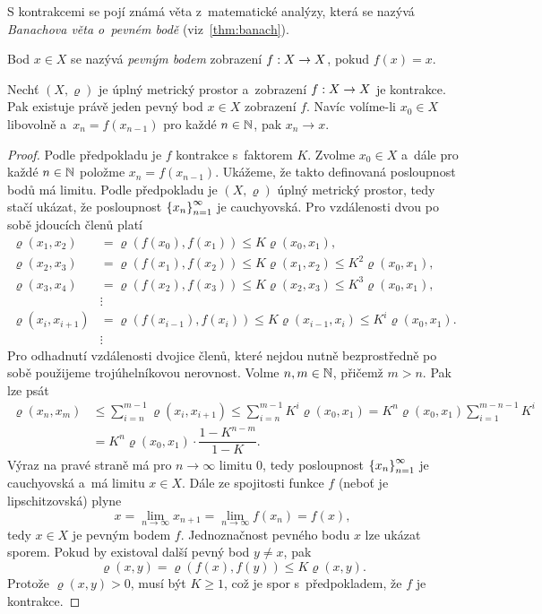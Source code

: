 S kontrakcemi se pojí známá věta z~matematické analýzy, která se nazývá \emph{Banachova věta o~pevném bodě} (viz~\ref{thm:banach}).
\begin{definition}\label{def:pevny-bod}
    Bod $x\in X$ se nazývá \emph{pevným bodem} zobrazení $f:X \rightarrow X$, pokud $f(x)=x$.
\end{definition}
\begin{theorem}\label{thm:banach}
    Nechť $(X,\varrho)$ je úplný metrický prostor a~zobrazení $f:X \rightarrow X$ je kontrakce. Pak existuje právě jeden pevný bod $x\in X$ zobrazení $f$. Navíc volíme-li $x_0\in X$ libovolně a~$x_n=f(x_{n-1})$ pro každé $n\in\mathbb{N}$, pak $x_n\to x$.
\end{theorem}
\begin{proof}
    Podle předpokladu je $f$ kontrakce s~faktorem $K$. Zvolme $x_0\in X$ a~dále pro každé $n\in\mathbb{N}$ položme $x_n=f(x_{n-1})$. Ukážeme, že takto definovaná posloupnost bodů má limitu. Podle předpokladu je $(X,\varrho)$ úplný metrický prostor, tedy stačí ukázat, že posloupnost $\left\{x_n\right\}_{n=1}^\infty$ je cauchyovská. Pro vzdálenosti dvou po sobě jdoucích členů platí
    \begin{align*}
        \varrho(x_1,x_2)&=\varrho(f(x_0),f(x_1))\leqslant K\varrho(x_0,x_1),\\
        \varrho(x_2,x_3)&=\varrho(f(x_1),f(x_2))\leqslant K\varrho(x_1,x_2)\leqslant K^2\varrho(x_0,x_1),\\
        \varrho(x_3,x_4)&=\varrho(f(x_2),f(x_3))\leqslant K\varrho(x_2,x_3)\leqslant K^3\varrho(x_0,x_1),\\
        &\vdots\\
        \varrho(x_i,x_{i+1})&=\varrho(f(x_{i-1}),f(x_i))\leqslant K\varrho(x_{i-1},x_i)\leqslant K^i\varrho(x_0,x_1).\\
        &\vdots
    \end{align*}
    Pro odhadnutí vzdálenosti dvojice členů, které nejdou nutně bezprostředně po sobě použijeme trojúhelníkovou nerovnost. Volme $n,m\in\mathbb{N}$, přičemž $m>n$. Pak lze psát
    \begin{align*}
        \varrho(x_n,x_m)&\leqslant\sum_{i=n}^{m-1}\varrho(x_i,x_{i+1})\leqslant\sum_{i=n}^{m-1}K^i\varrho(x_0,x_1)=K^n\varrho(x_0,x_1)\sum_{i=1}^{m-n-1}K^i\\
        &=K^n\varrho(x_0,x_1)\cdot\dfrac{1-K^{n-m}}{1-K}.
    \end{align*}
    Výraz na pravé straně má pro $n\to\infty$ limitu $0$, tedy posloupnost $\left\{x_n\right\}_{n=1}^\infty$ je cauchyovská a~má limitu $x\in X$. Dále ze spojitosti funkce $f$ (neboť je lipschitzovská) plyne
    \[x=\lim_{n\to\infty}x_{n+1}=\lim_{n\to\infty}f(x_n)=f(x),\]
    tedy $x\in X$ je pevným bodem $f$. Jednoznačnost pevného bodu $x$ lze ukázat sporem. Pokud by existoval další pevný bod $y\neq x$, pak
    \[\varrho(x,y)=\varrho(f(x),f(y))\leqslant K\varrho(x,y).\]
    Protože $\varrho(x,y)>0$, musí být $K\geqslant 1$, což je spor s~předpokladem, že $f$ je kontrakce.
\end{proof}
